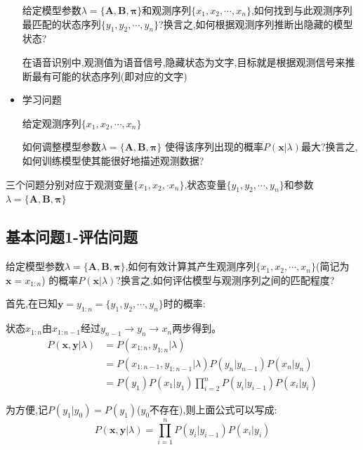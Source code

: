 \documentclass[UTF8,a4paper]{ctexart}%
\begin{document}
\begin{itemize}
                  给定模型参数$\lambda = \{\bm{A,B,\pi}\}$和观测序列$\{x_1, x_2, \cdots , x_n\}$,如何找到与此观测序列最匹配的状态序列$\{y_1,y_2 , \cdots , y_n\}$?换言之,如何根据观测序列推断出隐藏的模型状态?

                  {\color{blue}
                      在语音识别中,观测值为语音信号,隐藏状态为文字,目标就是根据观测信号来推断最有可能的状态序列(即对应的文字)
                  }

              \item 学习问题

                  给定观测序列$\{x_1, x_2, \cdots , x_n\}$

                  如何调整模型参数$\lambda = \{\bm{A,B,\pi}\}$ 使得该序列出现的概率$P(\bm{x} | \lambda)$最大?换言之,如何训练模型使其能很好地描述观测数据?

            \end{itemize}


            {\color{blue}
                三个问题分别对应于观测变量$\{x_1,x_2,\cdot x_n\}$,状态变量$\{y_1,y_2 , \cdots , y_n\}$和参数$\lambda = \{\bm{A,B,\pi}\}$
            }

        \subsection{基本问题1-评估问题}
            给定模型参数$\lambda = \{\bm{A,B,\pi}\}$,如何有效计算其产生观测序列$\{x_1, x_2, \cdots , x_n\}$(简记为$\bm{x} = x_{1:n}$) 的概率$P(\bm{x} | \lambda)$?换言之,如何评估模型与观测序列之间的匹配程度?

            首先,在已知$\bm{y} = y_{1:n} = \{y_1, y_2 , \cdots , y_n \}$时的概率:

            {\color{blue}
              状态$x_{1:n}$由$x_{1:n-1}$经过$y_{n-1}\to y_{n} \to x_{n}$两步得到。
            }
            \begin{equation}\begin{split}
              P(\bm{x,y}|\lambda) &= P(x_{1:n},y_{1:n} | \lambda)\\
              &= P(x_{1:n-1},y_{1:n-1} | \lambda)P(y_{n}|y_{n-1})P(x_n|y_{n})\\
              &= P(y_1)P(x_1|y_1)\prod_{i = 2}^n P(y_{i}|y_{i-1})P(x_i|y_{i})
            \end{split}\end{equation}

            为方便,记$P(y_1|y_0) = P(y_1)$($y_0$不存在),则上面公式可以写成:
            \begin{equation}
              P(\bm{x,y}|\lambda) = \prod_{i = 1}^n P(y_{i}|y_{i-1})P(x_i|y_{i})
            \end{equation}
\end{document}
